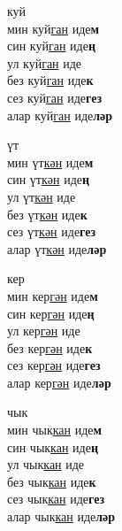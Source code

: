 \begin{multicols}{4}
\begin{enumerate}
\begin{minipage}{\linewidth}
    \item
    куй\\
    мин куй\underline{ган} иде\textbf{м}\\
    син куй\underline{ган} иде\textbf{ң}\\
    ул куй\underline{ган} иде\\
    без куй\underline{ган} иде\textbf{к}\\
    сез куй\underline{ган} иде\textbf{гез}\\
    алар куй\underline{ган} иде\textbf{ләр}\\
\end{minipage}

\begin{minipage}{\linewidth}
    \item
    үт\\
    мин үт\underline{кән} иде\textbf{м}\\
    син үт\underline{кән} иде\textbf{ң}\\
    ул үт\underline{кән} иде\\
    без үт\underline{кән} иде\textbf{к}\\
    сез үт\underline{кән} иде\textbf{гез}\\
    алар үт\underline{кән} иде\textbf{ләр}\\
\end{minipage}

\begin{minipage}{\linewidth}
    \item
    кер\\
    мин кер\underline{гән} иде\textbf{м}\\
    син кер\underline{гән} иде\textbf{ң}\\
    ул кер\underline{гән} иде\\
    без кер\underline{гән} иде\textbf{к}\\
    сез кер\underline{гән} иде\textbf{гез}\\
    алар кер\underline{гән} иде\textbf{ләр}\\
\end{minipage}

\begin{minipage}{\linewidth}
    \item
    чык\\
    мин чык\underline{кан} иде\textbf{м}\\
    син чык\underline{кан} иде\textbf{ң}\\
    ул чык\underline{кан} иде\\
    без чык\underline{кан} иде\textbf{к}\\
    сез чык\underline{кан} иде\textbf{гез}\\
    алар чык\underline{кан} иде\textbf{ләр}\\
\end{minipage}


\end{enumerate}
\end{multicols}
